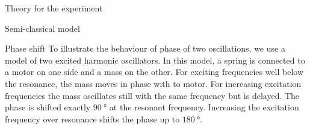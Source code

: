 \documentclass[pdftex, a4paper,11pt, twoside, UKenglish]{report}
\begin{document}
\begin{chapter}{Theory for the experiment}
\begin{section}{Semi-classical model}
    \end{section}


    \begin{section}{Phase shift}
      \label{chp:TheoryPhaseshift}
      To illustrate the behaviour of phase of two oscillations, we use a model
      of two excited harmonic oscillators. In this model, a spring is connected
      to a motor on one side and a mass on the other. For exciting frequencies
      well below the resonance, the mass moves in phase with to motor.
      For increasing excitation frequencies the mass oscillates still with the
      same frequency but is delayed. The phase is shifted exactly
      $\SI{90}{\degree}$ at the resonant frequency. Increasing the excitation
      frequency over resonance shifts the phase up to $\SI{180}{\degree}$.
      

\end{section}
\end{chapter}
\end{document}

